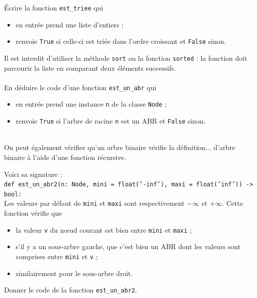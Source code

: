 \documentclass[a4paper,12pt,eval,firamath]{nsi}
\begin{document}
\question Écrire la fonction \texttt{est_triee} qui
\begin{itemize}
    \item en entrée prend une liste d'entiers ;
    \item renvoie \texttt{True} si celle-ci est triée dans l'ordre croissant et \texttt{False} sinon.
\end{itemize} 
Il est interdit d'utiliser la méthode \texttt{sort} ou la fonction \texttt{sorted} : la fonction doit parcourir la liste en comparant deux éléments successifs.\\

\\

\question En déduire le code d'une fonction \texttt{est_un_abr} qui
\begin{itemize}
    \item en entrée prend une instance \texttt{n}   de la classe \texttt{Node} ;
    \item renvoie \texttt{True} si l'arbre de racine \texttt{n}  est un ABR et \texttt{False} sinon.
\end{itemize} 

\\


On peut également vérifier qu'un arbre binaire vérifie la définition... d'arbre binaire à l'aide d'une fonction récursive.

Voici sa signature :\\

\texttt{def est_un_abr2(n: Node, mini = float('-inf'), maxi = float('inf')) -> bool:} \\

Les valeurs par défaut de \texttt{mini} et \texttt{maxi} sont respectivement $-\infty$ et $+\infty$.
Cette fonction vérifie que 
\begin{itemize}
    \item la valeur \texttt{v} du n\oe ud courant est bien entre \texttt{mini} et \texttt{maxi} ;
    \item s'il y a un sous-arbre gauche, que c'est bien un ABR dont les valeurs sont comprises entre \texttt{mini} et \texttt{v} ;
    \item similairement pour le sous-arbre droit.
\end{itemize}

\question Donner le code de la fonction \texttt{est_un_abr2}.\\

\end{document}
